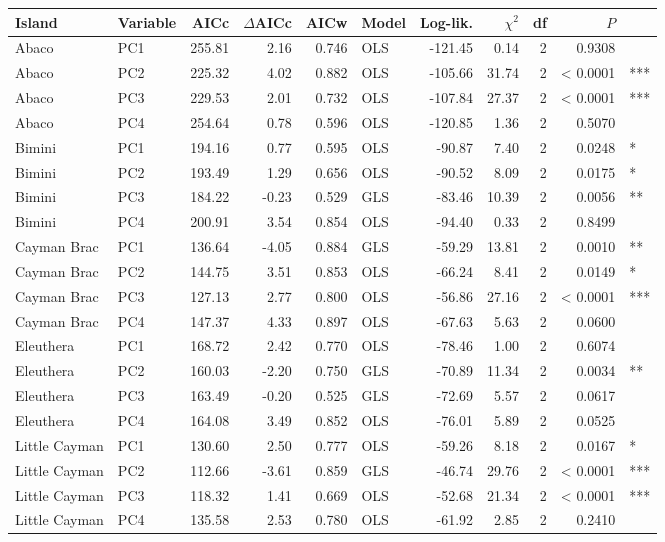 
\begin{tabular}{llrrrlrrrrl}
\toprule
Island & Variable & AICc & $\Delta$AICc & AICw & Model & Log-lik. & $\chi^2$ & df & $P$ & \\
\midrule
Abaco & PC1 & 255.81 & 2.16 & 0.746 & OLS & -121.45 & 0.14 & 2 & 0.9308 & \\
Abaco & PC2 & 225.32 & 4.02 & 0.882 & OLS & -105.66 & 31.74 & 2 & < 0.0001 & ***\\
Abaco & PC3 & 229.53 & 2.01 & 0.732 & OLS & -107.84 & 27.37 & 2 & < 0.0001 & ***\\
Abaco & PC4 & 254.64 & 0.78 & 0.596 & OLS & -120.85 & 1.36 & 2 & 0.5070 & \\
Bimini & PC1 & 194.16 & 0.77 & 0.595 & OLS & -90.87 & 7.40 & 2 & 0.0248 & *\\
Bimini & PC2 & 193.49 & 1.29 & 0.656 & OLS & -90.52 & 8.09 & 2 & 0.0175 & *\\
Bimini & PC3 & 184.22 & -0.23 & 0.529 & GLS & -83.46 & 10.39 & 2 & 0.0056 & **\\
Bimini & PC4 & 200.91 & 3.54 & 0.854 & OLS & -94.40 & 0.33 & 2 & 0.8499 & \\
Cayman Brac & PC1 & 136.64 & -4.05 & 0.884 & GLS & -59.29 & 13.81 & 2 & 0.0010 & **\\
Cayman Brac & PC2 & 144.75 & 3.51 & 0.853 & OLS & -66.24 & 8.41 & 2 & 0.0149 & *\\
Cayman Brac & PC3 & 127.13 & 2.77 & 0.800 & OLS & -56.86 & 27.16 & 2 & < 0.0001 & ***\\
Cayman Brac & PC4 & 147.37 & 4.33 & 0.897 & OLS & -67.63 & 5.63 & 2 & 0.0600 & \\
Eleuthera & PC1 & 168.72 & 2.42 & 0.770 & OLS & -78.46 & 1.00 & 2 & 0.6074 & \\
Eleuthera & PC2 & 160.03 & -2.20 & 0.750 & GLS & -70.89 & 11.34 & 2 & 0.0034 & **\\
Eleuthera & PC3 & 163.49 & -0.20 & 0.525 & GLS & -72.69 & 5.57 & 2 & 0.0617 & \\
Eleuthera & PC4 & 164.08 & 3.49 & 0.852 & OLS & -76.01 & 5.89 & 2 & 0.0525 & \\
Little Cayman & PC1 & 130.60 & 2.50 & 0.777 & OLS & -59.26 & 8.18 & 2 & 0.0167 & *\\
Little Cayman & PC2 & 112.66 & -3.61 & 0.859 & GLS & -46.74 & 29.76 & 2 & < 0.0001 & ***\\
Little Cayman & PC3 & 118.32 & 1.41 & 0.669 & OLS & -52.68 & 21.34 & 2 & < 0.0001 & ***\\
Little Cayman & PC4 & 135.58 & 2.53 & 0.780 & OLS & -61.92 & 2.85 & 2 & 0.2410 & \\

\end{tabular}
